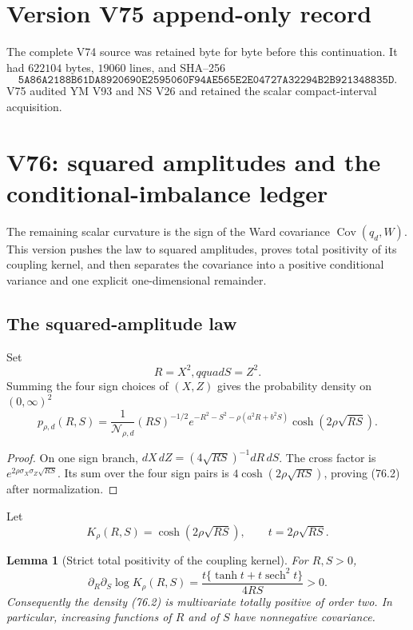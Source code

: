 \documentclass[11pt]{article}
\newtheorem{lemma}[theorem]{Lemma}
\theoremstyle{remark}
\begin{document}
\section*{Version V75 append-only record}
The complete V74 source was retained byte for byte before this
continuation.  It had \(622104\) bytes, \(19060\) lines, and SHA--256
\[
 \texttt{5A86A2188B61DA8920690E2595060F94AE565E2E04727A32294B2B921348835D}.
\]
V75 audited YM V93 and NS V26 and retained the scalar compact-interval
acquisition.


\section{V76: squared amplitudes and the conditional-imbalance ledger}
\label{sec:v17v76}

The remaining scalar curvature is the sign of the Ward covariance
\(\operatorname{Cov}(q_d,W)\).  This version pushes the law to squared
amplitudes, proves total positivity of its coupling kernel, and then
separates the covariance into a positive conditional variance and one
explicit one-dimensional remainder.

\subsection{The squared-amplitude law}

Set
\[
 R=X^2,qquad S=Z^2.                               \tag{76.1}
\]
Summing the four sign choices of \((X,Z)\) gives the probability
density on \((0,\infty)^2\)
\[
\boxed{
 p_{\rho,d}(R,S)
 =\frac1{\mathcal N_{\rho,d}}
 (RS)^{-1/2}e^{-R^2-S^2-\rho(a^2R+b^2S)}
 \cosh(2\rho\sqrt{RS}).}                         \tag{76.2}
\]

\begin{proof}
On one sign branch,
\(dX\,dZ=(4\sqrt{RS})^{-1}dR\,dS\).  The cross factor is
\(e^{2\rho\sigma_X\sigma_Z\sqrt{RS}}\).  Its sum over the four sign
pairs is \(4\cosh(2\rho\sqrt{RS})\), proving (76.2) after
normalization.
\end{proof}

Let
\[
 K_\rho(R,S)=\cosh(2\rho\sqrt{RS}),
 \qquad t=2\rho\sqrt{RS}.                         \tag{76.3}
\]

\begin{lemma}[Strict total positivity of the coupling kernel]
\label{lem:v17v76-tp2}
For \(R,S>0\),
\[
\boxed{
 \partial_R\partial_S\log K_\rho(R,S)
 =\frac{t\{\tanh t+t\operatorname{sech}^2t\}}
 {4RS}>0.}                                        \tag{76.4}
\]
Consequently the density (76.2) is multivariate totally positive of
order two.  In particular, increasing functions of \(R\) and of
\(S\) have nonnegative covariance.
\end{lemma}
\end{document}

